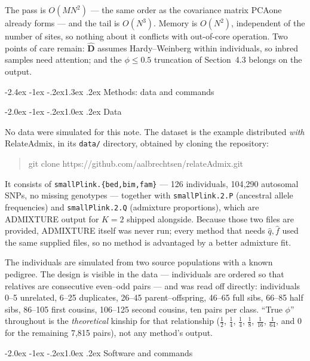 \documentclass[10pt,a4paper]{article}
\makeatletter
\renewcommand\section{\@startsection{section}{1}{\z@}%
  {-2.4ex \@plus -1ex \@minus -.2ex}{1.3ex \@plus.2ex}%
  {\normalfont\large\bfseries\color{hdr}}}
\renewcommand\subsection{\@startsection{subsection}{2}{\z@}%
  {-2.0ex \@plus -1ex \@minus -.2ex}{1.0ex \@plus.2ex}%
  {\normalfont\normalsize\bfseries\color{hdr}}}
\makeatother
\begin{document}
\noindent
The pass is $O(MN^2)$ --- the same order as the covariance matrix PCAone already forms --- and the tail is
$O(N^3)$. Memory is $O(N^2)$, independent of the number of sites, so nothing about it conflicts with
out-of-core operation. Two points of care remain: $\hat{\mathbf D}$ assumes Hardy--Weinberg within
individuals, so inbred samples need attention; and the $\phi\le0.5$ truncation of Section~4.3 belongs on the
output.

\section{Methods: data and commands}

\subsection{Data}

No data were simulated for this note. The dataset is the example distributed \emph{with} RelateAdmix, in its
\texttt{data/} directory, obtained by cloning the repository:

\begin{quote}\ttfamily\small
git clone https://github.com/aalbrechtsen/relateAdmix.git
\end{quote}

\noindent
It consists of \texttt{smallPlink.\{bed,bim,fam\}} --- 126 individuals, 104{,}290 autosomal SNPs, no missing
genotypes --- together with \texttt{smallPlink.2.P} (ancestral allele frequencies) and
\texttt{smallPlink.2.Q} (admixture proportions), which are ADMIXTURE output for $K=2$ shipped alongside. Because
those two files are provided, ADMIXTURE itself was never run; every method that needs $\hat q,\hat f$ used
the same supplied files, so no method is advantaged by a better admixture fit.

The individuals are simulated from two source populations with a known pedigree. The design is visible in
the data --- individuals are ordered so that relatives are consecutive even--odd pairs --- and was read off
directly: individuals 0--5 unrelated, 6--25 duplicates, 26--45 parent--offspring, 46--65 full sibs, 66--85
half sibs, 86--105 first cousins, 106--125 second cousins, ten pairs per class. ``True $\phi$'' throughout is
the \emph{theoretical} kinship for that relationship ($\tfrac12$, $\tfrac14$, $\tfrac14$, $\tfrac18$,
$\tfrac1{16}$, $\tfrac1{64}$, and $0$ for the remaining 7{,}815 pairs), not any method's output.

\subsection{Software and commands}
\end{document}
